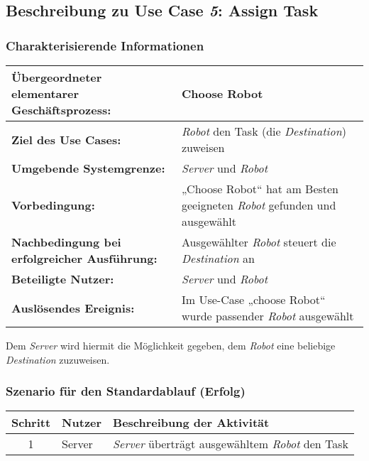 			
		\pagebreak

		\subsection{Beschreibung zu Use Case \emph{5}: Assign Task}

			\subsubsection*{Charakterisierende Informationen}

			\begin{table}[H]
				\centering
				\begin{tabularx}{\textwidth}{@{}p{5cm}X@{}}
				\hline
				\textbf{Übergeordneter elementarer Geschäftsprozess:} & Choose Robot  \\ \hline
				\textbf{Ziel des Use Cases:} & \emph{Robot} den Task (die \emph{Destination}) zuweisen\\ \hline
				\textbf{Umgebende Systemgrenze:} & \emph{Server} und \emph{Robot} \\ \hline
				\textbf{Vorbedingung:} & „Choose Robot“ hat am Besten geeigneten \emph{Robot} gefunden und ausgewählt\\ \hline
				\textbf{Nachbedingung bei erfolgreicher Ausführung:} & Ausgewählter \emph{Robot} steuert die \emph{Destination} an\\ \hline
				\textbf{Beteiligte Nutzer:} & \emph{Server} und \emph{Robot}\\ \hline
				\textbf{Auslösendes Ereignis:} & Im Use-Case „choose Robot“ wurde passender \emph{Robot} ausgewählt\\
				\hline
				\end{tabularx}
			\end{table}
			
			Dem \emph{Server} wird hiermit die Möglichkeit gegeben, dem \emph{Robot} eine beliebige \emph{Destination} zuzuweisen. 

			\subsubsection*{Szenario für den Standardablauf (Erfolg)}

			\begin{table}[H]
				\centering
				\begin{tabularx}{\textwidth}{@{}cp{2cm}X@{}}
				\hline
				Schritt & Nutzer & Beschreibung der Aktivität \\ \hline
				1 & Server & \emph{Server} überträgt ausgewähltem \emph{Robot} den Task \\
				\hline
				\end{tabularx}
			\end{table}

